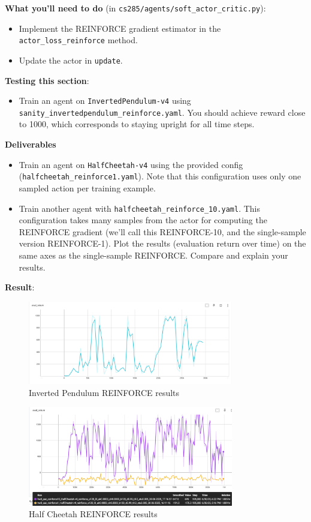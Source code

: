\textbf{What you'll need to do} (in \verb|cs285/agents/soft_actor_critic.py|):
\begin{itemize}
    \item Implement the REINFORCE gradient estimator in the \verb|actor_loss_reinforce| method.
    \item Update the actor in \verb|update|.
\end{itemize}

\textbf{Testing this section}:
\begin{itemize}
    \item Train an agent on \verb|InvertedPendulum-v4| using \verb|sanity_invertedpendulum_reinforce.yaml|. You should achieve reward close to 1000, which corresponds to staying upright for all time steps.
\end{itemize}

\textbf{Deliverables}
\begin{itemize}
    \item Train an agent on \verb|HalfCheetah-v4| using the provided config (\verb|halfcheetah_reinforce1.yaml|). Note that this configuration uses only one sampled action per training example.
    \item Train another agent with \verb|halfcheetah_reinforce_10.yaml|. This configuration takes many samples from the actor for computing the REINFORCE gradient (we'll call this REINFORCE-10, and the single-sample version REINFORCE-1). Plot the results (evaluation return over time) on the same axes as the single-sample REINFORCE. Compare and explain your results.
\end{itemize}

\textbf{Result}:
\begin{figure}[H]
    \centering
    \includegraphics[width=0.8\textwidth]{imgs/sac/sanity_reinforce_invertPendulum.png}
    \caption{Inverted Pendulum REINFORCE results}
    \label{fig:inverted_pendulum_reinforce}
\end{figure}

\begin{figure}[H]
    \centering
    \includegraphics[width=0.8\textwidth]{imgs/sac/half_cheetah_reinforce1_and_10.png}
    \caption{Half Cheetah REINFORCE results}
    \label{fig:half_cheetah_reinforce}
\end{figure}

